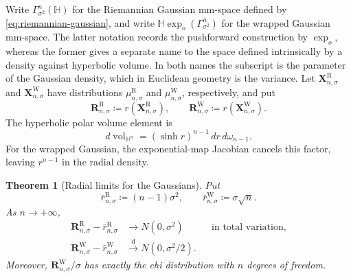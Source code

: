 \documentclass{amsart}
\numberwithin{equation}{section}
\theoremstyle{plain}
\newtheorem{thm}{Theorem}[section]
\theoremstyle{definition}
\theoremstyle{remark}
\newcommand{\Hyp}{\mathbb{H}}
\newcommand{\RGauss}[2]{\Gamma^{#1}_{#2^2}(\Hyp)}
\newcommand{\WGauss}[2]{\Hyp\exp_o(\Gamma^{#1}_{#2^2})}
\begin{document}
Write $\RGauss{n}{\sigma}$ for the Riemannian Gaussian mm-space defined by
\eqref{eq:riemannian-gaussian}, and write $\WGauss{n}{\sigma}$ for the wrapped
Gaussian mm-space.  The latter notation records the pushforward construction
by $\exp_o$, whereas the former gives a separate name to the space defined
intrinsically by a density against hyperbolic volume.  In both names the
subscript is the parameter of the Gaussian density, which in Euclidean
geometry is the variance.  Let
$\mathbf X^{\mathrm R}_{n,\sigma}$ and
$\mathbf X^{\mathrm W}_{n,\sigma}$ have distributions
$\mu^{\mathrm R}_{n,\sigma}$ and
$\mu^{\mathrm W}_{n,\sigma}$, respectively, and put
\[
	\mathbf R^{\mathrm R}_{n,\sigma}
	\coloneqq r(\mathbf X^{\mathrm R}_{n,\sigma}),
	\qquad
	\mathbf R^{\mathrm W}_{n,\sigma}
	\coloneqq r(\mathbf X^{\mathrm W}_{n,\sigma}).
\]
The hyperbolic polar volume element is
\[ d\operatorname{vol}_{\Hyp^n} = (\sinh r)^{n-1}\,dr\,d\omega_{n-1}. \]
For the wrapped Gaussian, the exponential-map Jacobian cancels this factor,
leaving $r^{n-1}$ in the radial density.

\begin{thm}[Radial limits for the Gaussians]
\label{thm:gaussian-radial-laws}
	Put
	\[
		\bar r^{\mathrm R}_{n,\sigma}
		\coloneqq(n-1)\sigma^2,
		\qquad
		\bar r^{\mathrm W}_{n,\sigma}
		\coloneqq\sigma\sqrt n.
	\]
	As $n\to+\infty$,
	\begin{align}
		\mathbf R^{\mathrm R}_{n,\sigma}
		-\bar r^{\mathrm R}_{n,\sigma}
		&\longrightarrow N(0,\sigma^2)
		&&\text{in total variation},
		\label{eq:R-radial-law}\\
		\mathbf R^{\mathrm W}_{n,\sigma}
		-\bar r^{\mathrm W}_{n,\sigma}
		&\overset{\mathrm d}{\longrightarrow}N(0,\sigma^2/2).
		\label{eq:W-radial-law}
	\end{align}
	Moreover, $\mathbf R^{\mathrm W}_{n,\sigma}/\sigma$ has exactly the
	chi distribution with $n$ degrees of freedom.
\end{thm}
\end{document}
